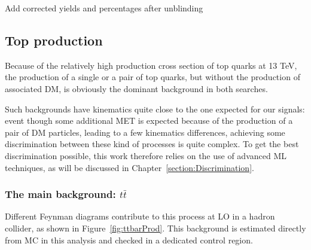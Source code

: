 \documentclass[a4paper, 10pt, openright]{report}
\begin{document}
\color{red} Add corrected yields and percentages after unblinding \color{black}

\subsection{Top production}

Because of the relatively high production cross section of top quarks at 13 TeV, the production of a single or a pair of top quarks, but without the production of associated \ac{DM}, is obviously the dominant background in both searches. 

Such backgrounds have kinematics quite close to the one expected for our signals: event though some additional \ac{MET} is expected because of the production of a pair of \ac{DM} particles, leading to a few kinematics differences, achieving some discrimination between these kind of processes is quite complex. To get the best discrimination possible, this work therefore relies on the use of advanced \acf{ML} techniques, as will be discussed in Chapter~\ref{section:Discrimination}.

\subsubsection{The main background: $t \bar t$} \label{subsection:ttbar}


Different Feynman diagrams contribute to this process at \ac{LO} in a hadron collider, as shown in Figure~\ref{fig:ttbarProd}. This background is estimated directly from \ac{MC} in this analysis and checked in a dedicated control region.
\end{document}
